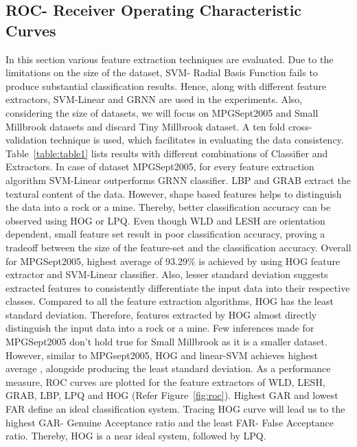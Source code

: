 \documentclass[english, 12pt]{article}
\begin{document}
\subsection{ROC- Receiver Operating Characteristic Curves}
\tab In this section various feature extraction techniques are evaluated. Due to the limitations on the size of the dataset, SVM- Radial Basis Function fails to produce substantial classification results. Hence, along with different feature extractors, SVM-Linear and GRNN are used in the experiments. Also, considering the size of datasets, we will focus on MPGSept2005 and Small Millbrook datasets and discard Tiny Millbrook dataset. A ten fold cross-validation technique is used, which facilitates in evaluating the data consistency.
\\
\tab Table~\ref{table:table1} lists results with different combinations of Classifier and Extractors.  In case of dataset MPGSept2005, for every feature extraction algorithm SVM-Linear outperforms GRNN classifier. LBP and GRAB extract the textural content of the data. However, shape based features helps to distinguish the data into a rock or a mine. Thereby, better classification accuracy can be observed using HOG or LPQ. Even though WLD and LESH are orientation dependent, small feature set result in poor classification accuracy, proving a tradeoff between the size of the feature-set and the classification accuracy. Overall for MPGSept2005, highest average of $93.29\%$ is achieved by using HOG feature extractor and SVM-Linear classifier. Also, lesser standard deviation suggests  extracted features to consistently differentiate the input data into their respective classes. Compared to all the feature extraction algorithms, HOG has the least standard deviation. Therefore, features extracted by HOG almost directly distinguish the input data into a rock or a mine. Few inferences made for MPGSept2005 don't hold true for Small Millbrook as it is a smaller dataset. However, similar to MPGsept2005, HOG and linear-SVM achieves highest average , alongside producing the least standard deviation. As a performance measure, ROC curves are plotted for the feature extractors of WLD, LESH, GRAB, LBP, LPQ and HOG (Refer Figure~\ref{fig:roc}). Highest GAR and lowest FAR define an ideal classification system. Tracing HOG curve will lead us to the highest GAR- Genuine Acceptance ratio and the least FAR- False Acceptance ratio. Thereby, HOG is a near ideal system, followed by LPQ.
\\
\\
\end{document}

